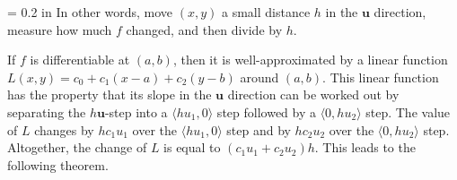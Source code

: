 \documentclass{watsonbook}
\begin{document}
  \begin{minipage}[t]{0.6\textwidth} \parskip = 0.2 in
    In other words, move $(x,y)$ a small distance $h$ in the
    $\mathbf{u}$ direction, measure how much $f$ changed, and then
    divide by $h$.

    If $f$ is differentiable at $(a,b)$, then it is well-approximated
    by a linear function $L(x,y) = c_0 + c_1(x-a) + c_2(y-b)$ around
    $(a,b)$. This linear function has the property that its slope in
    the $\mathbf{u}$ direction can be worked out by separating the
    $h\mathbf{u}$-step into a $\langle hu_1, 0 \rangle$ step followed
    by a $\langle 0, hu_2 \rangle$ step. The value of $L$ changes by
    $hc_1u_1$ over the $\langle hu_1, 0 \rangle$ step and by
    $hc_2u_2$ over the $\langle 0, hu_2 \rangle$ step. Altogether, the
    change of $L$ is equal to $(c_1u_1 + c_2u_2 )h$. This
    leads to the following theorem.
  \end{minipage}
\end{document}
